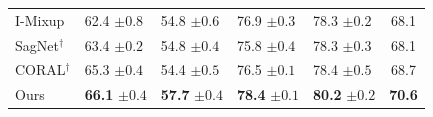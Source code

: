 \begin{table}[H]
\begin{tabular}{lllll|c}
I-Mixup & 62.4 \scriptsize$\pm0.8$ & 54.8 \scriptsize$\pm0.6$ & 76.9 \scriptsize$\pm0.3$ & 78.3 \scriptsize$\pm0.2$ & 68.1 \\
SagNet$^\dagger$ & 63.4 \scriptsize$\pm0.2$ & 54.8 \scriptsize$\pm0.4$ & 75.8 \scriptsize$\pm0.4$ & 78.3 \scriptsize$\pm0.3$ & 68.1 \\
CORAL$^\dagger$ & 65.3 \scriptsize$\pm0.4$ & 54.4 \scriptsize$\pm0.5$ & 76.5 \scriptsize$\pm0.1$ & 78.4 \scriptsize$\pm0.5$ & 68.7 \\
\midrule
Ours & \textbf{66.1} \scriptsize$\pm0.4$ & \textbf{57.7} \scriptsize$\pm0.4$ & \textbf{78.4} \scriptsize$\pm0.1$ & \textbf{80.2} \scriptsize$\pm0.2$ & \textbf{70.6} \\
\bottomrule
\end{tabular}
\end{table}
